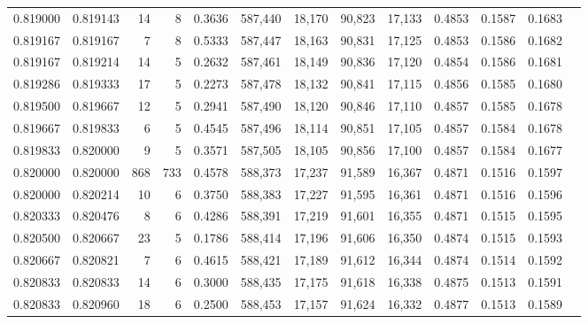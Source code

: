 \begin{tabular}{rrrrrrrrrrrrr}
0.819000 & 0.819143 &    14 &   8 &                                     0.3636 & 587,440 &  18,170 &  90,823 &  17,133 & 0.4853 & 0.1587 & 0.1683 \\
0.819167 & 0.819167 &     7 &   8 &                                     0.5333 & 587,447 &  18,163 &  90,831 &  17,125 & 0.4853 & 0.1586 & 0.1682 \\
0.819167 & 0.819214 &    14 &   5 &                                     0.2632 & 587,461 &  18,149 &  90,836 &  17,120 & 0.4854 & 0.1586 & 0.1681 \\
0.819286 & 0.819333 &    17 &   5 &                                     0.2273 & 587,478 &  18,132 &  90,841 &  17,115 & 0.4856 & 0.1585 & 0.1680 \\
0.819500 & 0.819667 &    12 &   5 &                                     0.2941 & 587,490 &  18,120 &  90,846 &  17,110 & 0.4857 & 0.1585 & 0.1678 \\
0.819667 & 0.819833 &     6 &   5 &                                     0.4545 & 587,496 &  18,114 &  90,851 &  17,105 & 0.4857 & 0.1584 & 0.1678 \\
0.819833 & 0.820000 &     9 &   5 &                                     0.3571 & 587,505 &  18,105 &  90,856 &  17,100 & 0.4857 & 0.1584 & 0.1677 \\
0.820000 & 0.820000 &   868 & 733 &                                     0.4578 & 588,373 &  17,237 &  91,589 &  16,367 & 0.4871 & 0.1516 & 0.1597 \\
0.820000 & 0.820214 &    10 &   6 &                                     0.3750 & 588,383 &  17,227 &  91,595 &  16,361 & 0.4871 & 0.1516 & 0.1596 \\
0.820333 & 0.820476 &     8 &   6 &                                     0.4286 & 588,391 &  17,219 &  91,601 &  16,355 & 0.4871 & 0.1515 & 0.1595 \\
0.820500 & 0.820667 &    23 &   5 &                                     0.1786 & 588,414 &  17,196 &  91,606 &  16,350 & 0.4874 & 0.1515 & 0.1593 \\
0.820667 & 0.820821 &     7 &   6 &                                     0.4615 & 588,421 &  17,189 &  91,612 &  16,344 & 0.4874 & 0.1514 & 0.1592 \\
0.820833 & 0.820833 &    14 &   6 &                                     0.3000 & 588,435 &  17,175 &  91,618 &  16,338 & 0.4875 & 0.1513 & 0.1591 \\
0.820833 & 0.820960 &    18 &   6 &                                     0.2500 & 588,453 &  17,157 &  91,624 &  16,332 & 0.4877 & 0.1513 & 0.1589 \\

\end{tabular}
